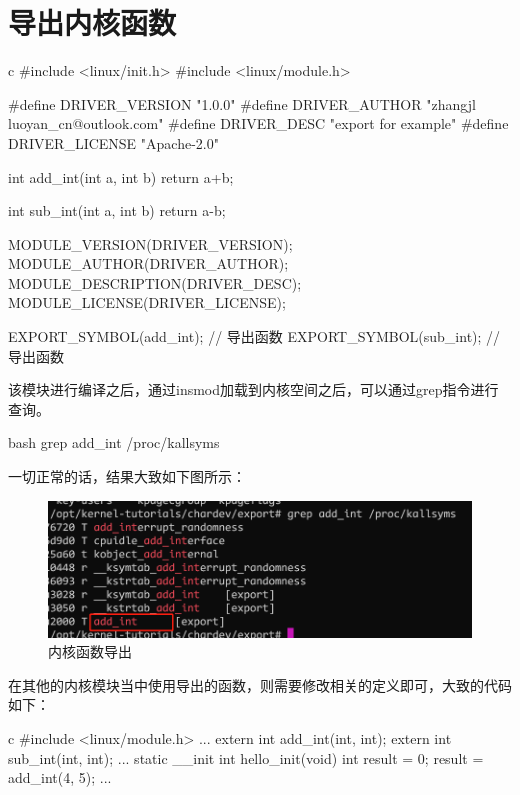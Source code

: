 \section{导出内核函数}
\begin{code-block}{c}
#include <linux/init.h>
#include <linux/module.h>

#define DRIVER_VERSION  "1.0.0"
#define DRIVER_AUTHOR   "zhangjl luoyan_cn@outlook.com"
#define DRIVER_DESC     "export for example"
#define DRIVER_LICENSE  "Apache-2.0"

int add_int(int a, int b)
{
        return a+b;
}

int sub_int(int a, int b)
{
        return a-b;
}

MODULE_VERSION(DRIVER_VERSION);
MODULE_AUTHOR(DRIVER_AUTHOR);
MODULE_DESCRIPTION(DRIVER_DESC);
MODULE_LICENSE(DRIVER_LICENSE);

EXPORT_SYMBOL(add_int); // 导出函数
EXPORT_SYMBOL(sub_int); // 导出函数
\end{code-block}

该模块进行编译之后，通过insmod加载到内核空间之后，可以通过grep指令进行查询。
\begin{code-block}{bash}
grep add_int /proc/kallsyms
\end{code-block}
一切正常的话，结果大致如下图所示：
\begin{figure}[H]
  \centering
  \includegraphics[width=\linewidth]{export.png}
  \caption{内核函数导出}
  \label{fig:export}
\end{figure}

在其他的内核模块当中使用导出的函数，则需要修改相关的定义即可，大致的代码如下：
\begin{code-block}{c}
#include <linux/module.h>
...
extern int add_int(int, int);
extern int sub_int(int, int);
...
static __init int hello_init(void)
{
    int result = 0;
    result = add_int(4, 5);
...
}
\end{code-block}

